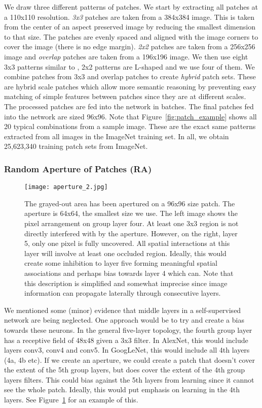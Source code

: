 \documentclass[10pt,twocolumn,letterpaper]{article}
\begin{document}
We draw three different patterns of patches. We start by extracting all patches at a 110x110 resolution. \emph{3x3} patches are taken from a 384x384 image. This is taken from the center of an aspect preserved image by reducing the smallest dimension to that size. The patches are evenly spaced and aligned with the image corners to cover the image (there is no edge margin). \emph{2x2} patches are taken from a 256x256 image and \emph{overlap} patches are taken from a 196x196 image. We then use eight 3x3 patterns similar to \cite{Doersch15}, 2x2 patterns are L-shaped and we use four of them. We combine patches from 3x3 and overlap patches to create \emph{hybrid} patch sets. These are hybrid scale patches which allow more semantic reasoning by preventing easy matching of simple features between patches since they are at different scales. The processed patches are fed into the network in batches. The final patches fed into the network are sized 96x96. Note that Figure~\ref{fig:patch_example} shows all 20 typical combinations from a sample image. These are the exact same patterns extracted from all images in the ImageNet training set. In all, we obtain 25,623,340 training patch sets from ImageNet. 

\subsubsection{Random Aperture of Patches (RA)}
\begin{figure}
\centering
\texttt{[image: aperture\_2.jpg]}
\caption{The grayed-out area has been apertured on a 96x96 size patch. The aperture is 64x64, the smallest size we use. The left image shows the pixel arrangement on group layer four. At least one 3x3 region is not directly interfered with by the aperture. However, on the right, layer 5, only one pixel is fully uncovered. All spatial interactions at this layer will involve at least one occluded region. Ideally, this would create some inhibition to layer five forming meaningful spatial associations and perhaps bias towards layer 4 which can. Note that this description is simplified and somewhat imprecise since image information can propagate laterally through consecutive layers.}
\label{fig:aperture}
\end{figure}
We mentioned some (minor) evidence that middle layers in a self-supervised network are being neglected. One approach would be to try and create a bias towards these neurons. In the general five-layer topology, the fourth group layer has a receptive field of 48x48 given a 3x3 filter. In AlexNet, this would include layers conv3, conv4 and conv5. In GoogLeNet, this would include all 4th layers (4a, 4b etc). If we create an aperture, we could create a patch that doesn't cover the extent of the 5th group layers, but does cover the extent of the 4th group layers filters. This could bias against the 5th layers from learning since it cannot see the whole patch. Ideally, this would put emphasis on learning in the 4th layers. See Figure~\ref{fig:aperture} for an example of this.
\end{document}
